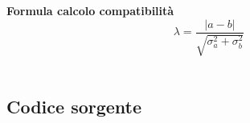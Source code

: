 \documentclass[a4paper,11pt,oneside]{article}
\begin{document}
\textbf{Formula calcolo compatibilità}\\
\begin{equation*}
    \lambda=\frac{\left|a-b\right|}{\sqrt{\sigma^{2}_{a}+\sigma^{2}_{b}}}
\end{equation*}\\

\subsection{Codice sorgente}
\begin{lstlisting}[language=C++, label=lst:statistica.h, caption=statistica.h]
\end{lstlisting}
\end{document}
